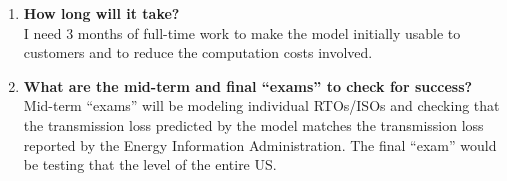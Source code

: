 \documentclass{article}
\begin{document}
\begin{enumerate}
  \item
  \textbf{How long will it take?} \\
  I need 3 months of full-time work to make the model initially usable to
  customers and to reduce the computation costs involved.

  \item
  \textbf{What are the mid-term and final ``exams'' to check for success?} \\
  Mid-term ``exams'' will be modeling individual RTOs/ISOs and checking that the
  transmission loss predicted by the model matches the transmission loss
  reported by the Energy Information Administration. The final ``exam'' would be
  testing that the level of the entire US.

\end{enumerate}
\end{document}
